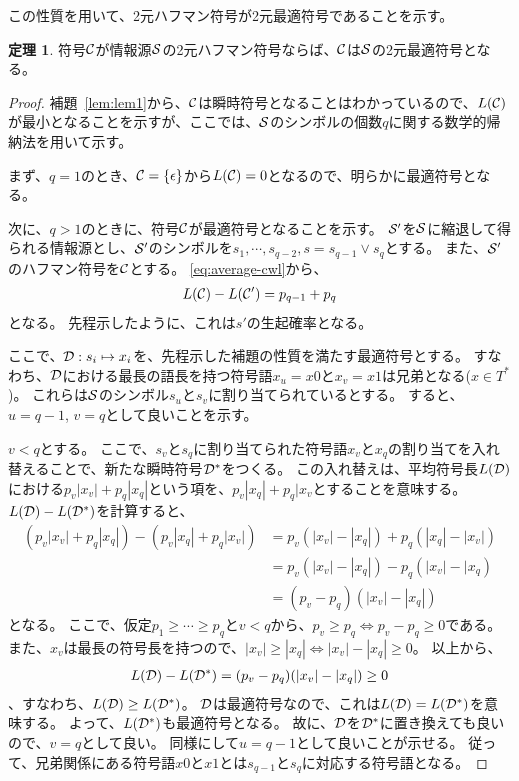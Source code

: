 \documentclass[pdflatex, ja=standard, a4paper]{bxjsarticle}
\theoremstyle{definition}
\newtheorem{theorem}{定理}
\newcommand{\lemref}[1]{補題~\ref{#1}}
\begin{document}
この性質を用いて、2元ハフマン符号が2元最適符号であることを示す。
\begin{theorem}
    符号$\mathcal{C}$が情報源$\mathcal{S}$の2元ハフマン符号ならば、$\mathcal{C}$は$\mathcal{S}$の2元最適符号となる。
\end{theorem}
\begin{proof}
    \lemref{lem:lem1}から、$\mathcal{C}$は瞬時符号となることはわかっているので、$L(\mathcal{C})$が最小となることを示すが、ここでは、$\mathcal{S}$のシンボルの個数$q$に関する数学的帰納法を用いて示す。

    まず、$q = 1$のとき、$\mathcal{C} = \{\epsilon\}$から$L(\mathcal{C}) = 0$となるので、明らかに最適符号となる。

    次に、$q > 1$のときに、符号$\mathcal{C}$が最適符号となることを示す。
    $\mathcal{S}'$を$\mathcal{S}$に縮退して得られる情報源とし、$\mathcal{S}'$のシンボルを$s_1, \cdots, s_{q - 2}, s = s_{q - 1} \lor s_q$とする。
    また、$\mathcal{S}'$のハフマン符号を$\mathcal{C}$とする。
    \eqref{eq:average-cwl}から、
    \begin{align*}
        L(\mathcal{C}) - L(\mathcal{C}') = p_{q - 1} + p_q
    \end{align*}
    となる。
    先程示したように、これは$s'$の生起確率となる。

    ここで、$\mathcal{D}: s_i \mapsto x_i$を、先程示した補題の性質を満たす最適符号とする。
    すなわち、$\mathcal{D}$における最長の語長を持つ符号語$x_u = x 0$と$x_v = x 1$は兄弟となる($x \in T^*$)。
    これらは$\mathcal{S}$のシンボル$s_u$と$s_v$に割り当てられているとする。
    すると、$u = q - 1$, $v = q$として良いことを示す。

    $v < q$とする。
    ここで、$s_v$と$s_q$に割り当てられた符号語$x_v$と$x_q$の割り当てを入れ替えることで、新たな瞬時符号$\mathcal{D}^*$をつくる。
    この入れ替えは、平均符号長$L(\mathcal{D})$における$p_v |x_v| + p_q |x_q|$という項を、$p_v |x_q| + p_q |x_v$とすることを意味する。
    $L(\mathcal{D}) - L(\mathcal{D}^*)$を計算すると、
    \begin{align*}
        (p_v |x_v| + p_q |x_q|) - (p_v |x_q| + p_q |x_v|)
            &= p_v (|x_v| - |x_q|) + p_q (|x_q| - |x_v|) \\
            &= p_v (|x_v| - |x_q|) - p_q (|x_v| - |x_q) \\
            &= (p_v - p_q)(|x_v| - |x_q|)
    \end{align*}
    となる。
    ここで、仮定$p_1 \geq \cdots \geq p_q$と$v < q$から、$p_v \geq p_q \iff p_v - p_q \geq 0$である。
    また、$x_v$は最長の符号長を持つので、$|x_v| \geq |x_q| \iff |x_v| - |x_q| \geq 0$。
    以上から、
    \begin{align*}
        L(\mathcal{D}) - L(\mathcal{D}^*) = (p_v - p_q)(|x_v| - |x_q|) \geq 0
    \end{align*}
    、すなわち、$L(\mathcal{D}) \geq L(\mathcal{D}^*)$。
    $\mathcal{D}$は最適符号なので、これは$L(\mathcal{D}) = L(\mathcal{D}^*)$を意味する。
    よって、$L(\mathcal{D}^*)$も最適符号となる。
    故に、$\mathcal{D}$を$\mathcal{D}^*$に置き換えても良いので、$v = q$として良い。
    同様にして$u = q - 1$として良いことが示せる。
    従って、兄弟関係にある符号語$x 0$と$x 1$とは$s_{q - 1}$と$s_q$に対応する符号語となる。


\end{proof}
\end{document}
